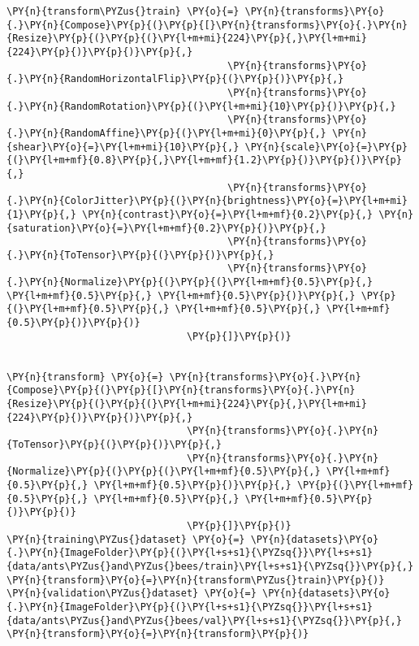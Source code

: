    \begin{tcolorbox}[breakable, size=fbox, boxrule=1pt, pad at break*=1mm,colback=cellbackground, colframe=cellborder]
\begin{Verbatim}[commandchars=\\\{\}]
\PY{n}{transform\PYZus{}train} \PY{o}{=} \PY{n}{transforms}\PY{o}{.}\PY{n}{Compose}\PY{p}{(}\PY{p}{[}\PY{n}{transforms}\PY{o}{.}\PY{n}{Resize}\PY{p}{(}\PY{p}{(}\PY{l+m+mi}{224}\PY{p}{,}\PY{l+m+mi}{224}\PY{p}{)}\PY{p}{)}\PY{p}{,}
                                      \PY{n}{transforms}\PY{o}{.}\PY{n}{RandomHorizontalFlip}\PY{p}{(}\PY{p}{)}\PY{p}{,}
                                      \PY{n}{transforms}\PY{o}{.}\PY{n}{RandomRotation}\PY{p}{(}\PY{l+m+mi}{10}\PY{p}{)}\PY{p}{,}
                                      \PY{n}{transforms}\PY{o}{.}\PY{n}{RandomAffine}\PY{p}{(}\PY{l+m+mi}{0}\PY{p}{,} \PY{n}{shear}\PY{o}{=}\PY{l+m+mi}{10}\PY{p}{,} \PY{n}{scale}\PY{o}{=}\PY{p}{(}\PY{l+m+mf}{0.8}\PY{p}{,}\PY{l+m+mf}{1.2}\PY{p}{)}\PY{p}{)}\PY{p}{,}
                                      \PY{n}{transforms}\PY{o}{.}\PY{n}{ColorJitter}\PY{p}{(}\PY{n}{brightness}\PY{o}{=}\PY{l+m+mi}{1}\PY{p}{,} \PY{n}{contrast}\PY{o}{=}\PY{l+m+mf}{0.2}\PY{p}{,} \PY{n}{saturation}\PY{o}{=}\PY{l+m+mf}{0.2}\PY{p}{)}\PY{p}{,}
                                      \PY{n}{transforms}\PY{o}{.}\PY{n}{ToTensor}\PY{p}{(}\PY{p}{)}\PY{p}{,}
                                      \PY{n}{transforms}\PY{o}{.}\PY{n}{Normalize}\PY{p}{(}\PY{p}{(}\PY{l+m+mf}{0.5}\PY{p}{,} \PY{l+m+mf}{0.5}\PY{p}{,} \PY{l+m+mf}{0.5}\PY{p}{)}\PY{p}{,} \PY{p}{(}\PY{l+m+mf}{0.5}\PY{p}{,} \PY{l+m+mf}{0.5}\PY{p}{,} \PY{l+m+mf}{0.5}\PY{p}{)}\PY{p}{)}
                               \PY{p}{]}\PY{p}{)}


\PY{n}{transform} \PY{o}{=} \PY{n}{transforms}\PY{o}{.}\PY{n}{Compose}\PY{p}{(}\PY{p}{[}\PY{n}{transforms}\PY{o}{.}\PY{n}{Resize}\PY{p}{(}\PY{p}{(}\PY{l+m+mi}{224}\PY{p}{,}\PY{l+m+mi}{224}\PY{p}{)}\PY{p}{)}\PY{p}{,}
                               \PY{n}{transforms}\PY{o}{.}\PY{n}{ToTensor}\PY{p}{(}\PY{p}{)}\PY{p}{,}
                               \PY{n}{transforms}\PY{o}{.}\PY{n}{Normalize}\PY{p}{(}\PY{p}{(}\PY{l+m+mf}{0.5}\PY{p}{,} \PY{l+m+mf}{0.5}\PY{p}{,} \PY{l+m+mf}{0.5}\PY{p}{)}\PY{p}{,} \PY{p}{(}\PY{l+m+mf}{0.5}\PY{p}{,} \PY{l+m+mf}{0.5}\PY{p}{,} \PY{l+m+mf}{0.5}\PY{p}{)}\PY{p}{)}
                               \PY{p}{]}\PY{p}{)}
\PY{n}{training\PYZus{}dataset} \PY{o}{=} \PY{n}{datasets}\PY{o}{.}\PY{n}{ImageFolder}\PY{p}{(}\PY{l+s+s1}{\PYZsq{}}\PY{l+s+s1}{data/ants\PYZus{}and\PYZus{}bees/train}\PY{l+s+s1}{\PYZsq{}}\PY{p}{,} \PY{n}{transform}\PY{o}{=}\PY{n}{transform\PYZus{}train}\PY{p}{)}
\PY{n}{validation\PYZus{}dataset} \PY{o}{=} \PY{n}{datasets}\PY{o}{.}\PY{n}{ImageFolder}\PY{p}{(}\PY{l+s+s1}{\PYZsq{}}\PY{l+s+s1}{data/ants\PYZus{}and\PYZus{}bees/val}\PY{l+s+s1}{\PYZsq{}}\PY{p}{,} \PY{n}{transform}\PY{o}{=}\PY{n}{transform}\PY{p}{)}


\end{Verbatim}
\end{tcolorbox}
